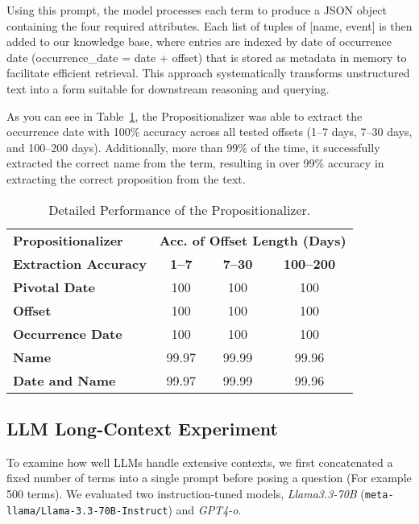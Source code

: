 \documentclass[11pt]{article}
\begin{document}
Using this prompt, the model processes each term to produce a JSON object containing the four required attributes. Each list of tuples of [name, event] is then added to our knowledge base, where entries are indexed by date of occurrence date (occurrence\_date = date + offset) that is stored as metadata in memory to facilitate efficient retrieval. This approach systematically transforms unstructured text into a form suitable for downstream reasoning and querying. 

As you can see in Table~\ref{tab:propositionalizer}, the Propositionalizer was able to extract the occurrence date with 100\% accuracy across all tested offsets (1–7 days, 7–30 days, and 100–200 days). Additionally, more than 99\% of the time, it successfully extracted the correct name from the term, resulting in over 99\% accuracy in extracting the correct proposition from the text.

\begin{table}[ht]
\centering
\caption{Detailed Performance of the Propositionalizer.}
\label{tab:propositionalizer}
\begin{tabular}{l|ccc}
\hline
\textbf{Propositionalizer} & \multicolumn{3}{c}{\small{\textbf{Acc. of Offset Length (Days)}}} \\
\cline{2-4}
\small{\textbf{Extraction Accuracy}}  & \textbf{1--7 }  & \textbf{7--30 } & \textbf{100--200 } \\
\hline
\textbf{Pivotal Date} & 100 & 100 & 100 \\
\textbf{Offset} & 100 & 100 & 100 \\
\textbf{Occurrence Date} & 100 & 100 & 100 \\
\textbf{Name} & 99.97 & 99.99 & 99.96 \\
\textbf{Date and Name} & 99.97 & 99.99 & 99.96 \\
\hline
\end{tabular}
\end{table}

\subsection{LLM Long-Context Experiment}

To examine how well LLMs handle extensive contexts, we first concatenated a fixed number of terms into a single prompt before posing a question (For example 500 terms). We evaluated two instruction-tuned models, \emph{Llama3.3-70B} (\texttt{meta-llama/Llama-3.3-70B-Instruct}) and \emph{GPT4-o}. 
\end{document}
